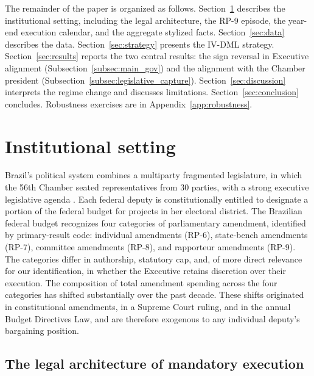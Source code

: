 \documentclass[preprint,12pt,authoryear]{elsarticle}
\begin{document}
The remainder of the paper is organized as follows. Section~\ref{sec:institutional} describes the institutional setting, including the legal architecture, the RP-9 episode, the year-end execution calendar, and the aggregate stylized facts. Section~\ref{sec:data} describes the data. Section~\ref{sec:strategy} presents the IV-DML strategy. Section~\ref{sec:results} reports the two central results: the sign reversal in Executive alignment (Subsection~\ref{subsec:main_gov}) and the alignment with the Chamber president (Subsection~\ref{subsec:legislative_capture}). Section~\ref{sec:discussion} interprets the regime change and discusses limitations. Section~\ref{sec:conclusion} concludes. Robustness exercises are in Appendix~\ref{app:robustness}.

\section{Institutional setting}
\label{sec:institutional}

Brazil's political system combines a multiparty fragmented legislature, in which the 56th Chamber seated representatives from 30 parties, with a strong executive legislative agenda \citep{Abranches1988,FigueiredoLimongi2000}. Each federal deputy is constitutionally entitled to designate a portion of the federal budget for projects in her electoral district. The Brazilian federal budget recognizes four categories of parliamentary amendment, identified by primary-result code: individual amendments (RP-6), state-bench amendments (RP-7), committee amendments (RP-8), and rapporteur amendments (RP-9). The categories differ in authorship, statutory cap, and, of more direct relevance for our identification, in whether the Executive retains discretion over their execution. The composition of total amendment spending across the four categories has shifted substantially over the past decade. These shifts originated in constitutional amendments, in a Supreme Court ruling, and in the annual Budget Directives Law, and are therefore exogenous to any individual deputy's bargaining position.

\subsection{The legal architecture of mandatory execution}
\label{subsec:legal_architecture}
\end{document}
